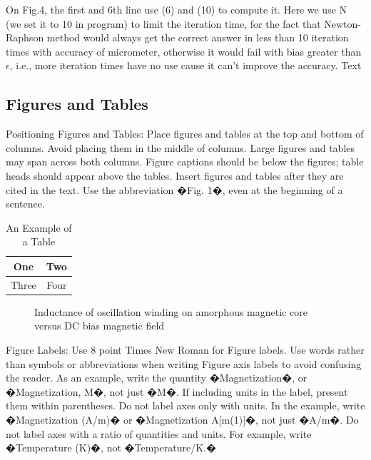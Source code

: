 \documentclass[letterpaper, 10 pt, conference]{ieeeconf}  %
\begin{document}
On Fig.4, the first and 6th line use (6) and (10) to compute it. Here we use N (we set it to 10 in program) to limit the iteration time, for the fact that Newton-Raphson method would always get the correct answer in less than 10 iteration times with accuracy of micrometer, otherwise it would fail with bias greater than $\epsilon$, i.e., more iteration times have no use cause it can't improve the accuracy.  Text

\subsection{Figures and Tables}

Positioning Figures and Tables: Place figures and tables at the top and bottom of columns. Avoid placing them in the middle of columns. Large figures and tables may span across both columns. Figure captions should be below the figures; table heads should appear above the tables. Insert figures and tables after they are cited in the text. Use the abbreviation �Fig. 1�, even at the beginning of a sentence.

\begin{table}[h]
\caption{An Example of a Table}
\label{table_example}
\begin{center}
\begin{tabular}{|c||c|}
\hline
One & Two\\
\hline
Three & Four\\
\hline
\end{tabular}
\end{center}
\end{table}


   \begin{figure}[thpb]
      \centering
      \caption{Inductance of oscillation winding on amorphous
       magnetic core versus DC bias magnetic field}
      \label{figurelabel}
   \end{figure}
   

Figure Labels: Use 8 point Times New Roman for Figure labels. Use words rather than symbols or abbreviations when writing Figure axis labels to avoid confusing the reader. As an example, write the quantity �Magnetization�, or �Magnetization, M�, not just �M�. If including units in the label, present them within parentheses. Do not label axes only with units. In the example, write �Magnetization (A/m)� or �Magnetization {A[m(1)]}�, not just �A/m�. Do not label axes with a ratio of quantities and units. For example, write �Temperature (K)�, not �Temperature/K.�
\end{document}

